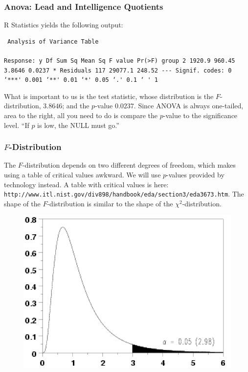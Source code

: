 \documentclass[xcolor=dvipsnames]{beamer} \usepackage{teachbeamer}
\begin{document}
\begin{frame}[fragile]
  \frametitle{Anova: Lead and Intelligence Quotients}
  R Statistics yields the following output:
\begin{verbatim} Analysis of Variance Table

Response: y Df Sum Sq Mean Sq F value Pr(>F) group 2 1920.9 960.45 3.8646 0.0237 * Residuals 117 29077.1 248.52 --- Signif. codes: 0 ‘***' 0.001 ‘**' 0.01 ‘*' 0.05 ‘.' 0.1 ‘ ' 1
\end{verbatim} What is important to us is the test statistic, whose distribution is the $F$-distribution, $3.8646$; and the $p$-value $0.0237$. Since ANOVA is always one-tailed, area to the right, all you need to do is compare the $p$-value to the significance level. ``If $p$ is low, the NULL must go.''
\end{frame}

\begin{frame}
  \frametitle{$F$-Distribution} The $F$-distribution depends on two different degrees of freedom, which makes using a table of critical values awkward. We will use $p$-values provided by technology instead. A table with critical values is here: {\footnotesize \texttt{http://www.itl.nist.gov/div898/handbook/eda/section3/eda3673.htm}}. The shape of the $F$-distribution is similar to the shape of the $\chi^{2}$-distribution.
\begin{figure}[h]
  \includegraphics[scale=0.25]{./diagrams/fdist.png}
\end{figure}
\end{frame}
\end{document}
